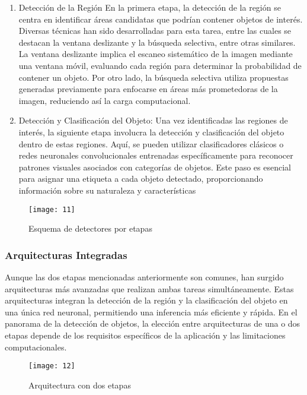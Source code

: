 	\begin{enumerate}
		\item Detección de la Región
En la primera etapa, la detección de la región se centra en identificar áreas candidatas que podrían contener objetos de interés. Diversas técnicas han sido desarrolladas para esta tarea, entre las cuales se destacan la ventana deslizante y la búsqueda selectiva, entre otras similares. La ventana deslizante implica el escaneo sistemático de la imagen mediante una ventana móvil, evaluando cada región para determinar la probabilidad de contener un objeto. Por otro lado, la búsqueda selectiva utiliza propuestas generadas previamente para enfocarse en áreas más prometedoras de la imagen, reduciendo así la carga computacional.

	\item Detección y Clasificación del Objeto:
Una vez identificadas las regiones de interés, la siguiente etapa involucra la detección y clasificación del objeto dentro de estas regiones. Aquí, se pueden utilizar clasificadores clásicos o redes neuronales convolucionales entrenadas específicamente para reconocer patrones visuales asociados con categorías de objetos. Este paso es esencial para asignar una etiqueta a cada objeto detectado, proporcionando información sobre su naturaleza y características
	
	\end{enumerate}	

	\begin{figure}[ht]
	    \centering
		\texttt{[image: 11]}
		\caption{Esquema de detectores por etapas}
	\end{figure}
	
	\subsubsection{Arquitecturas Integradas}
	Aunque las dos etapas mencionadas anteriormente son comunes, han surgido arquitecturas más avanzadas que realizan ambas tareas simultáneamente. Estas arquitecturas integran la detección de la región y la clasificación del objeto en una única red neuronal, permitiendo una inferencia más eficiente y rápida.
En el panorama de la detección de objetos, la elección entre arquitecturas de una o dos etapas depende de los requisitos específicos de la aplicación y las limitaciones computacionales.

	\begin{figure}[ht]
	    \centering
		\texttt{[image: 12]}
		\caption{Arquitectura con dos etapas}
	\end{figure}
	
